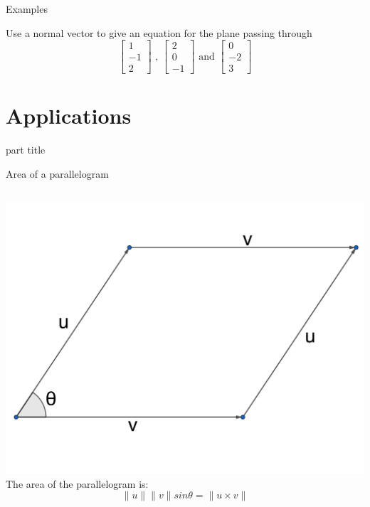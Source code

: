 \documentclass{beamer}
\begin{document}
\begin{frame}{Examples}
\begin{example}
  Use a normal vector to give an equation for the plane passing through
  \begin{equation*}
  \left[
  \begin{array}{c}
  1\\
  -1\\
  2
  \end{array}
  \right]\text{ , } \left[
  \begin{array}{c}
  2\\
  0\\
  -1
  \end{array}
  \right]\text{ and }
  \left[
  \begin{array}{c}
  0\\
  -2\\
  3
  \end{array}
  \right]
  \end{equation*}
\end{example}
\end{frame}

\section{Applications}

\begin{frame}
\begin{beamercolorbox}[sep=12pt,center]{part title}
\insertsection\par
\end{beamercolorbox}
\end{frame}

\begin{frame}{Area of a parallelogram}
\begin{columns}
  \includegraphics{parallelogram.png}
  The area of the parallelogram is:
  \begin{equation*}
  \|u\|\|v\|sin\theta = \|u\times v\|
  \end{equation*}
\end{columns}
\end{frame}
\end{document}
